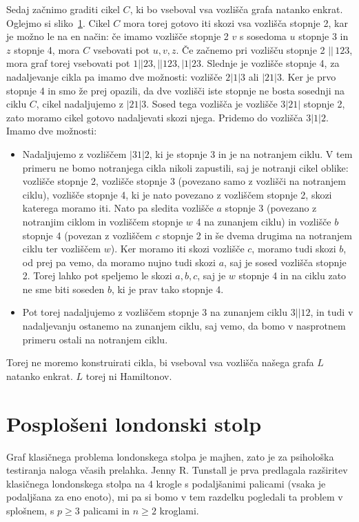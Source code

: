 \documentclass[12pt,a4paper]{amsart}
\theoremstyle{definition} %
\theoremstyle{plain} %
\begin{document}
    Sedaj začnimo graditi cikel $C$, ki bo vseboval vsa vozlišča grafa natanko enkrat. Oglejmo si sliko~\ref{}.
    Cikel $C$ mora torej gotovo iti skozi vsa vozlišča stopnje 2, kar je možno le na en način: če imamo vozlišče stopnje 2 $v$ s sosedoma $u$ stopnje 3 in $z$ stopnje 4, mora $C$ vsebovati pot $u,v,z$.
    Če začnemo pri vozlišču stopnje 2 $||\,123$, mora graf torej vsebovati pot $1||23, ||123, |1|23$. Slednje je vozlišče stopnje 4, za nadaljevanje cikla pa imamo dve možnosti: vozlišče $2|1|3$ ali $|21|3$. Ker je prvo stopnje 4 in smo že prej opazili, da dve vozlišči iste stopnje ne bosta sosednji na ciklu $C$, cikel nadaljujemo z $|21|3$. Sosed tega vozlišča je vozlišče $3|21|$ stopnje 2, zato moramo cikel gotovo nadaljevati skozi njega. Pridemo do vozlišča $3|1|2$. Imamo dve možnosti: 
    \begin{itemize}[label={-}]
        \item Nadaljujemo z vozliščem $|31|2$, ki je stopnje 3 in je na notranjem ciklu. V tem primeru ne bomo notranjega cikla nikoli zapustili, saj je notranji cikel oblike: vozlišče stopnje 2, vozlišče stopnje 3 (povezano samo z vozlišči na notranjem ciklu), vozlišče stopnje 4, ki je nato povezano z vozliščem stopnje 2, skozi katerega moramo iti. Nato pa sledita vozlišče $a$ stopnje 3 (povezano z notranjim ciklom in vozliščem stopnje $w$ 4 na zunanjem ciklu) in vozlišče $b$ stopnje 4 (povezan z vozliščem $c$ stopnje 2 in še dvema drugima na notranjem ciklu ter vozliščem $w$). Ker moramo iti skozi vozlišče $c$, moramo tudi skozi $b$, od prej pa vemo, da moramo nujno tudi skozi $a$, saj je sosed vozlišča stopnje 2. Torej lahko pot speljemo le skozi $a,b,c$, saj je $w$ stopnje 4 in na ciklu zato ne sme biti soseden $b$, ki je prav tako stopnje 4.
        \item Pot torej nadaljujemo z vozliščem stopnje 3 na zunanjem ciklu $3||12$, in tudi v nadaljevanju ostanemo na zunanjem ciklu, saj vemo, da bomo v nasprotnem primeru ostali na notranjem ciklu.
    \end{itemize}
    Torej ne moremo konstruirati cikla, bi vseboval vsa vozlišča našega grafa $L$ natanko enkrat. $L$ torej ni Hamiltonov.
    \qedhere
\endproof

\section{Posplošeni londonski stolp}
Graf klasičnega problema londonskega stolpa je majhen, zato je za psihološka testiranja naloga včasih prelahka. 
Jenny R. Tunstall je prva predlagala razširitev klasičnega londonskega stolpa na 4 krogle s podaljšanimi palicami (vsaka je podaljšana za eno enoto), mi pa si bomo v tem razdelku pogledali ta problem v splošnem, s $p \geq 3$ palicami in $n \geq 2$ kroglami.
\end{document}
